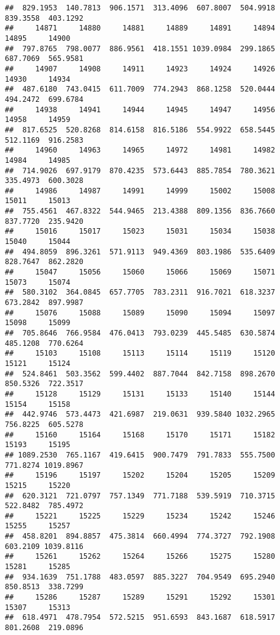 \documentclass[
]{article}
\begin{document}
\begin{verbatim}
##  829.1953  140.7813  906.1571  313.4096  607.8007  504.9918  839.3558  403.1292 
##     14871     14880     14881     14889     14891     14894     14895     14900 
##  797.8765  798.0077  886.9561  418.1551 1039.0984  299.1865  687.7069  565.9581 
##     14907     14908     14911     14923     14924     14926     14930     14934 
##  487.6180  743.0415  611.7009  774.2943  868.1258  520.0444  494.2472  699.6784 
##     14938     14941     14944     14945     14947     14956     14958     14959 
##  817.6525  520.8268  814.6158  816.5186  554.9922  658.5445  512.1169  916.2583 
##     14960     14963     14965     14972     14981     14982     14984     14985 
##  714.9026  697.9179  870.4235  573.6443  885.7854  780.3621  335.4973  600.3028 
##     14986     14987     14991     14999     15002     15008     15011     15013 
##  755.4561  467.8322  544.9465  213.4388  809.1356  836.7660  837.7720  235.9420 
##     15016     15017     15023     15031     15034     15038     15040     15044 
##  494.8059  896.3261  571.9113  949.4369  803.1986  535.6409  828.7647  862.2820 
##     15047     15056     15060     15066     15069     15071     15073     15074 
##  580.3102  364.0845  657.7705  783.2311  916.7021  618.3237  673.2842  897.9987 
##     15076     15088     15089     15090     15094     15097     15098     15099 
##  705.8646  766.9584  476.0413  793.0239  445.5485  630.5874  485.1208  770.6264 
##     15103     15108     15113     15114     15119     15120     15121     15124 
##  524.8461  503.3562  599.4402  887.7044  842.7158  898.2670  850.5326  722.3517 
##     15128     15129     15131     15133     15140     15144     15154     15158 
##  442.9746  573.4473  421.6987  219.0631  939.5840 1032.2965  756.8225  605.5278 
##     15160     15164     15168     15170     15171     15182     15193     15195 
## 1089.2530  765.1167  419.6415  900.7479  791.7833  555.7500  771.8274 1019.8967 
##     15196     15197     15202     15204     15205     15209     15215     15220 
##  620.3121  721.0797  757.1349  771.7188  539.5919  710.3715  522.8482  785.4972 
##     15221     15225     15229     15234     15242     15246     15255     15257 
##  458.8201  894.8857  475.3814  660.4994  774.3727  792.1908  603.2109 1039.8116 
##     15261     15262     15264     15266     15275     15280     15281     15285 
##  934.1639  751.1788  483.0597  885.3227  704.9549  695.2940  850.8513  338.7299 
##     15286     15287     15289     15291     15292     15301     15307     15313 
##  618.4971  478.7954  572.5215  951.6593  843.1687  618.5917  801.2608  219.0896 

\end{verbatim}
\end{document}
